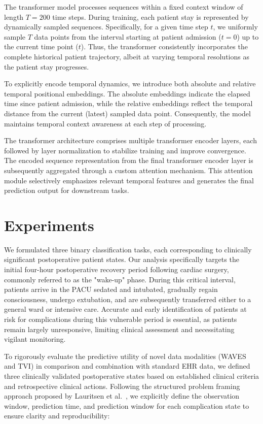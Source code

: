 The transformer model processes sequences within a fixed context window of length $T = 200$ time steps. During training, each patient stay is represented by dynamically sampled sequences. Specifically, for a given time step $t$, we uniformly sample $T$ data points from the interval starting at patient admission ($t=0$) up to the current time point ($t$). Thus, the transformer consistently incorporates the complete historical patient trajectory, albeit at varying temporal resolutions as the patient stay progresses.

To explicitly encode temporal dynamics, we introduce both absolute and relative temporal positional embeddings. The absolute embeddings indicate the elapsed time since patient admission, while the relative embeddings reflect the temporal distance from the current (latest) sampled data point. Consequently, the model maintains temporal context awareness at each step of processing.

The transformer architecture comprises multiple transformer encoder layers, each followed by layer normalization to stabilize training and improve convergence. The encoded sequence representation from the final transformer encoder layer is subsequently aggregated through a custom attention mechanism. This attention module selectively emphasizes relevant temporal features and generates the final prediction output for downstream tasks.


\section{Experiments}

We formulated three binary classification tasks, each corresponding to clinically significant postoperative patient states. Our analysis specifically targets the initial four-hour postoperative recovery period following cardiac surgery, commonly referred to as the "wake-up" phase. During this critical interval, patients arrive in the PACU sedated and intubated, gradually regain consciousness, undergo extubation, and are subsequently transferred either to a general ward or intensive care. Accurate and early identification of patients at risk for complications during this vulnerable period is essential, as patients remain largely unresponsive, limiting clinical assessment and necessitating vigilant monitoring.

To rigorously evaluate the predictive utility of novel data modalities (WAVES and TVI) in comparison and combination with standard EHR data, we defined three clinically validated postoperative states based on established clinical criteria and retrospective clinical actions. Following the structured problem framing approach proposed by Lauritsen et al.~\citep{lauritsen2021framing}, we explicitly define the observation window, prediction time, and prediction window for each complication state to ensure clarity and reproducibility:

